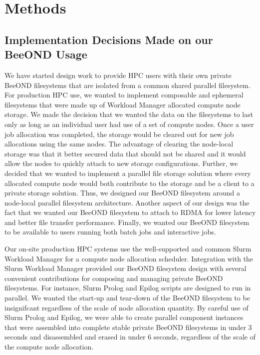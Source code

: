 \section{Methods}


\subsection{Implementation Decisions Made on our BeeOND Usage}

We have started design work to provide HPC users with their own private BeeOND filesystems that are isolated from a common shared parallel filesystem.  For production HPC use, we wanted to implement composable and ephemeral filesystems that were made up of Workload Manager allocated compute node storage.  We made the decision that we wanted the data on the filesystems to last only as long as an individual user had use of a set of compute nodes.  Once a user job allocation was completed, the storage would be cleared out for new job allocations using the same nodes.  The advantage of clearing the node-local storage was that it better secured data that should not be shared and it would allow the nodes to quickly attach to new storage configurations.  Further, we decided that we wanted to implement a parallel file storage solution where every allocated compute node would both contribute to the storage and be a client to a private storage solution.  Thus, we designed our BeeOND filesystem around a node-local parallel filesystem architecture.  Another aspect of our design was the fact that we wanted our BeeOND filesystem to attach to RDMA for lower latency and better file transfer performance.  Finally, we wanted our BeeOND filesystem to be available to users running both batch jobs and interactive jobs.  

Our on-site production HPC systems use the well-supported and common Slurm Workload Manager for a compute node allocation scheduler. Integration with the Slurm Workload Manager provided our BeeOND filesystem design with several convenient contributions for composing and managing private BeeOND filesystems.  For instance, Slurm Prolog and Epilog scripts are designed to run in parallel. We wanted the start-up and tear-down of the BeeOND filesystem to be insignifcant regardless of the scale of node allocation quantity. By careful use of Slurm Prolog and Epilog, we were able to create parallel component instances that were assembled into complete stable private BeeOND filesystems in under 3 seconds and disassembled and erased in under 6 seconds, regardless of the scale of the compute node allocation.  

